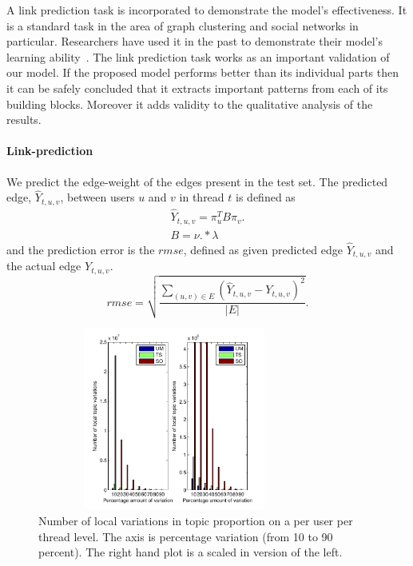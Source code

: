\documentclass{sig-alternate}
\begin{document}
A link prediction task is incorporated to demonstrate the model's effectiveness.
It is a standard task in the area of graph clustering and social networks in
particular. Researchers have
used it in the past to demonstrate their model's learning 
ability~\cite{Nallapati:2008:JLT:1401890.1401957}.   
The link prediction task works as an important validation of our model. If the
proposed model performs better than its individual parts then it can be safely
concluded that it extracts important patterns from each of its building
blocks. Moreover it adds validity to the qualitative analysis of the results. 

\vspace*{-0.5\baselineskip}
\paragraph{Link-prediction} 
  
 We predict the edge-weight of the edges
present in the test set. The predicted edge, $\hat{Y}_{t,u,v}$, between users $u$ and
$v$ in thread $t$ is  defined as 
\vspace*{-1\baselineskip}
\small
\begin{align}
\hat{Y}_{t,u,v} = \pi^T_uB\pi_v\label{eqn:prediction}.\\
B=\nu.*\lambda\label{eqn:blockMat}
\end{align}
\normalsize
and the prediction error is the $rmse$, defined as given predicted edge
$\hat{Y}_{t,u,v}$ and the actual edge $Y_{t,u,v}$.
\vspace*{-0.5\baselineskip}
\small
\begin{equation}
	rmse=\sqrt{\frac{\sum_{(u,v)\in E}(\hat{Y}_{t,u,v}-Y_{t,u,v})^2}{|E|}}.
\end{equation}
\normalsize

\begin{figure}
\begin{center}
\includegraphics[height=6cm,width=9cm]{TopicVariationsLocal.pdf}
\end{center}
\caption{\small{Number of local variations in topic proportion on a per user per thread
level. The axis is percentage variation (from 10 to 90 percent). The right hand
plot is a scaled in version of the left.}}
\label{fig:localTopicVariations}
\end{figure}
\end{document}

